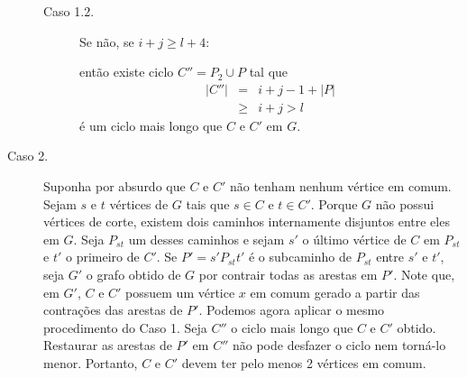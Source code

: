 \begin{description}
\begin{description}
        \item[Caso 1.2.] Se não, se $i + j \ge l + 4$:

        então existe ciclo $C'' = P_2 \cup P$ tal que
        \begin{eqnarray}
            |C''| &=& i + j - 1 + |P| \nonumber \\
                 &\ge& i + j > l \nonumber
        \end{eqnarray}
        é um ciclo mais longo que $C$ e $C'$ em $G$.
    \end{description}

\item[Caso 2.] Suponha por absurdo que $C$ e $C'$ não tenham nenhum vértice em
comum. Sejam $s$ e $t$ vértices de $G$ tais que $s \in C$ e $t \in C'$. Porque
$G$ não possui vértices de corte, existem dois caminhos internamente disjuntos
entre eles em $G$. Seja $P_{st}$ um desses caminhos e sejam $s'$ o último
vértice de $C$ em $P_{st}$ e $t'$ o primeiro de $C'$. Se $P' = s'P_{st}t'$ é o
subcaminho de $P_{st}$ entre $s'$ e $t'$, seja $G'$ o grafo obtido de $G$ por
contrair todas as arestas em $P'$. Note que, em $G'$, $C$ e $C'$ possuem um
vértice $x$ em comum gerado a partir das contrações das arestas de $P'$.
Podemos agora aplicar o mesmo procedimento do Caso 1. Seja $C''$ o ciclo mais
longo que $C$ e $C'$ obtido. Restaurar as arestas de $P'$ em $C''$ não pode
desfazer o ciclo nem torná-lo menor. Portanto, $C$ e $C'$ devem ter pelo menos
2 vértices em comum.

\end{description}
\fimprova


